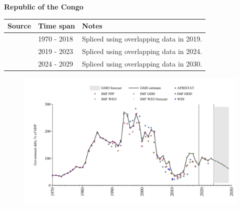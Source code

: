 \documentclass[12pt,a4paper,landscape]{article}
\begin{document}
\begin{adjustbox}{max totalsize={\paperwidth}{\paperheight},center}
\begin{minipage}[t][\textheight][t]{\textwidth}
\vspace*{0.5cm}
{}
\begin{center}
{\Large\bfseries Republic of the Congo}
\end{center}
\vspace{0.5cm}
\begin{table}[H]
\centering
\small
\begin{tabular}{|l|l|l|}
\hline
\textbf{Source} & \textbf{Time span} & \textbf{Notes} \\
\hline
\rowcolor{white}\cite{IMF_GDD}& 1970 - 2018 &Spliced using overlapping data in 2019.\\
\rowcolor{lightgray}\cite{IMF_FPP}& 2019 - 2023 &Spliced using overlapping data in 2024.\\
\rowcolor{white}\cite{IMF_WEO_forecast}& 2024 - 2029 &Spliced using overlapping data in 2030.\\
\hline
\end{tabular}
\end{table}
\begin{figure}[H]
\centering
\includegraphics[width=\textwidth,height=0.6\textheight,keepaspectratio]{graphs/COG_govdebt_GDP.pdf}
\end{figure}
\end{minipage}
\end{adjustbox}
\end{document}
